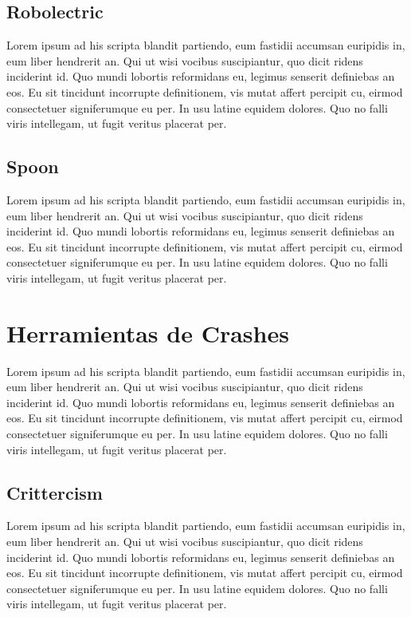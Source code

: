 \subsection{Robolectric}
Lorem ipsum ad his scripta blandit partiendo, eum fastidii accumsan euripidis in, eum liber hendrerit an. Qui ut wisi vocibus suscipiantur, quo dicit ridens inciderint id. Quo mundi lobortis reformidans eu, legimus senserit definiebas an eos. Eu sit tincidunt incorrupte definitionem, vis mutat affert percipit cu, eirmod consectetuer signiferumque eu per. In usu latine equidem dolores. Quo no falli viris intellegam, ut fugit veritus placerat per.

\subsection{Spoon}
Lorem ipsum ad his scripta blandit partiendo, eum fastidii accumsan euripidis in, eum liber hendrerit an. Qui ut wisi vocibus suscipiantur, quo dicit ridens inciderint id. Quo mundi lobortis reformidans eu, legimus senserit definiebas an eos. Eu sit tincidunt incorrupte definitionem, vis mutat affert percipit cu, eirmod consectetuer signiferumque eu per. In usu latine equidem dolores. Quo no falli viris intellegam, ut fugit veritus placerat per.

\section{Herramientas de Crashes}
Lorem ipsum ad his scripta blandit partiendo, eum fastidii accumsan euripidis in, eum liber hendrerit an. Qui ut wisi vocibus suscipiantur, quo dicit ridens inciderint id. Quo mundi lobortis reformidans eu, legimus senserit definiebas an eos. Eu sit tincidunt incorrupte definitionem, vis mutat affert percipit cu, eirmod consectetuer signiferumque eu per. In usu latine equidem dolores. Quo no falli viris intellegam, ut fugit veritus placerat per.

\subsection{Crittercism}
Lorem ipsum ad his scripta blandit partiendo, eum fastidii accumsan euripidis in, eum liber hendrerit an. Qui ut wisi vocibus suscipiantur, quo dicit ridens inciderint id. Quo mundi lobortis reformidans eu, legimus senserit definiebas an eos. Eu sit tincidunt incorrupte definitionem, vis mutat affert percipit cu, eirmod consectetuer signiferumque eu per. In usu latine equidem dolores. Quo no falli viris intellegam, ut fugit veritus placerat per.

